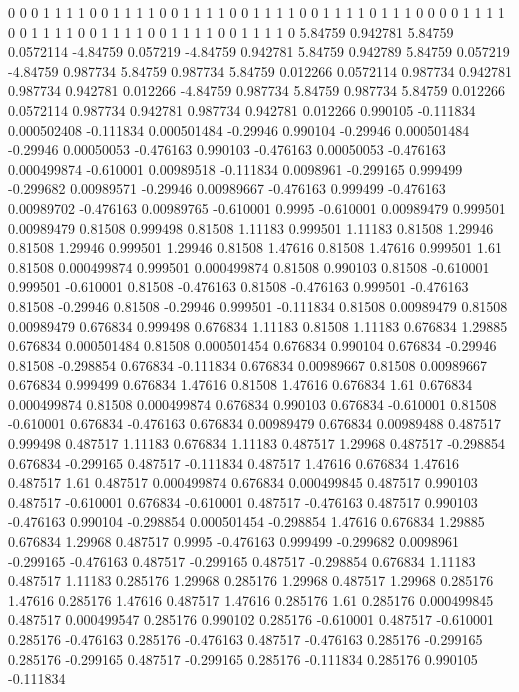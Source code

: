 0 0
0 1
1 1
1 0
0 1
1 1
1 0
0 1
1 1
1 0
0 1
1 1
1 0
0 1
1 1
1 0
1 1
1 0
0 0
0 1
1 1
1 0
0 1
1 1
1 0
0 1
1 1
1 0
0 1
1 1
1 0
0 1
1 1
1 0
5.84759 0.942781
5.84759 0.0572114
-4.84759 0.057219
-4.84759 0.942781
5.84759 0.942789
5.84759 0.057219
-4.84759 0.987734
5.84759 0.987734
5.84759 0.012266
0.0572114 0.987734
0.942781 0.987734
0.942781 0.012266
-4.84759 0.987734
5.84759 0.987734
5.84759 0.012266
0.0572114 0.987734
0.942781 0.987734
0.942781 0.012266
0.990105 -0.111834
0.000502408 -0.111834
0.000501484 -0.29946
0.990104 -0.29946
0.000501484 -0.29946
0.00050053 -0.476163
0.990103 -0.476163
0.00050053 -0.476163
0.000499874 -0.610001
0.00989518 -0.111834
0.0098961 -0.299165
0.999499 -0.299682
0.00989571 -0.29946
0.00989667 -0.476163
0.999499 -0.476163
0.00989702 -0.476163
0.00989765 -0.610001
0.9995 -0.610001
0.00989479 0.999501
0.00989479 0.81508
0.999498 0.81508
1.11183 0.999501
1.11183 0.81508
1.29946 0.81508
1.29946 0.999501
1.29946 0.81508
1.47616 0.81508
1.47616 0.999501
1.61 0.81508
0.000499874 0.999501
0.000499874 0.81508
0.990103 0.81508
-0.610001 0.999501
-0.610001 0.81508
-0.476163 0.81508
-0.476163 0.999501
-0.476163 0.81508
-0.29946 0.81508
-0.29946 0.999501
-0.111834 0.81508
0.00989479 0.81508
0.00989479 0.676834
0.999498 0.676834
1.11183 0.81508
1.11183 0.676834
1.29885 0.676834
0.000501484 0.81508
0.000501454 0.676834
0.990104 0.676834
-0.29946 0.81508
-0.298854 0.676834
-0.111834 0.676834
0.00989667 0.81508
0.00989667 0.676834
0.999499 0.676834
1.47616 0.81508
1.47616 0.676834
1.61 0.676834
0.000499874 0.81508
0.000499874 0.676834
0.990103 0.676834
-0.610001 0.81508
-0.610001 0.676834
-0.476163 0.676834
0.00989479 0.676834
0.00989488 0.487517
0.999498 0.487517
1.11183 0.676834
1.11183 0.487517
1.29968 0.487517
-0.298854 0.676834
-0.299165 0.487517
-0.111834 0.487517
1.47616 0.676834
1.47616 0.487517
1.61 0.487517
0.000499874 0.676834
0.000499845 0.487517
0.990103 0.487517
-0.610001 0.676834
-0.610001 0.487517
-0.476163 0.487517
0.990103 -0.476163
0.990104 -0.298854
0.000501454 -0.298854
1.47616 0.676834
1.29885 0.676834
1.29968 0.487517
0.9995 -0.476163
0.999499 -0.299682
0.0098961 -0.299165
-0.476163 0.487517
-0.299165 0.487517
-0.298854 0.676834
1.11183 0.487517
1.11183 0.285176
1.29968 0.285176
1.29968 0.487517
1.29968 0.285176
1.47616 0.285176
1.47616 0.487517
1.47616 0.285176
1.61 0.285176
0.000499845 0.487517
0.000499547 0.285176
0.990102 0.285176
-0.610001 0.487517
-0.610001 0.285176
-0.476163 0.285176
-0.476163 0.487517
-0.476163 0.285176
-0.299165 0.285176
-0.299165 0.487517
-0.299165 0.285176
-0.111834 0.285176
0.990105 -0.111834
